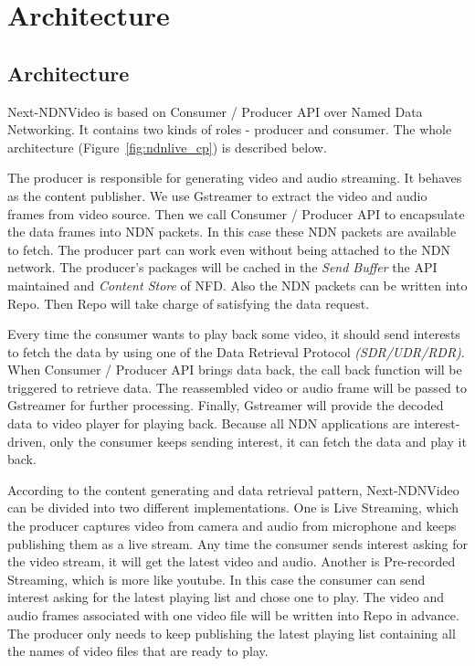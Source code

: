 \vspace{0.3cm}
\section{Architecture} %
\label{sec:arch}
\subsection{Architecture}
Next-NDNVideo is based on Consumer / Producer API over Named Data Networking. It contains two kinds of roles - producer and consumer. The whole architecture (Figure~\ref{fig:ndnlive_cp}) is described below.


The producer is responsible for generating video and audio streaming. It behaves as the content publisher. We use Gstreamer to extract the video and audio frames from video source. Then we call Consumer / Producer API to encapsulate the data frames into NDN packets. In this case these NDN packets are available to fetch. The producer part can work even without being attached to the NDN network. The producer's packages will be cached in the \textit{Send Buffer} the API maintained and \textit{Content Store} of NFD. Also the NDN packets can be written into Repo. Then Repo will take charge of satisfying the data request.

Every time the consumer wants to play back some video, it should send interests to fetch the data by using one of the Data Retrieval Protocol \textit{(SDR/UDR/RDR)}. When Consumer / Producer API brings data back, the call back function will be triggered to retrieve data. The reassembled video or audio frame will be passed to Gstreamer for further processing. Finally, Gstreamer will provide the decoded data to video player for playing back. Because all NDN applications are interest-driven, only the consumer keeps sending interest, it can fetch the data and play it back.

According to the content generating and data retrieval pattern, Next-NDNVideo can be divided into two different implementations. One is Live Streaming, which the producer captures video from camera and audio from microphone and keeps publishing them as a live stream. Any time the consumer sends interest asking for the video stream, it will get the latest video and audio. Another is Pre-recorded Streaming, which is more like youtube. In this case the consumer can send interest asking for the latest playing list and chose one to play. The video and audio frames associated with one video file will be written into Repo in advance. The producer only needs to keep publishing the latest playing list containing all the names of video files that are ready to play.


